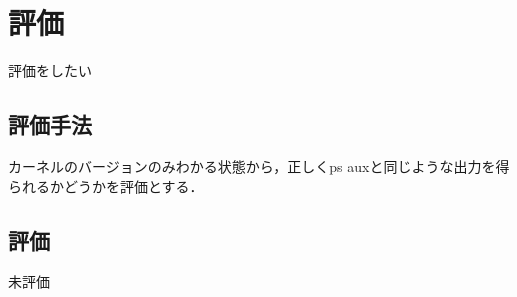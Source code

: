 \chapter{評価}
\label{chap:evaluation}

評価をしたい

\section{評価手法}

カーネルのバージョンのみわかる状態から，正しくps auxと同じような出力を得られるかどうかを評価とする．

\section{評価}

未評価
